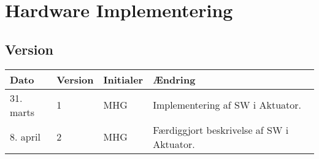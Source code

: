 \chapter{Hardware Implementering}

\section{Version}
\begin{table}[h]
	\centering
	\begin{tabularx}{\textwidth - 2cm}{|l|l|l|X|}
	\hline
	Dato	& Version	& Initialer & Ændring	\\ \hline
	31. marts & 1 & MHG & Implementering af SW i Aktuator. \\ \hline
	8. april & 2 & MHG & Færdiggjort beskrivelse af SW i Aktuator. \\\hline
	\end{tabularx}
\end{table}

%
